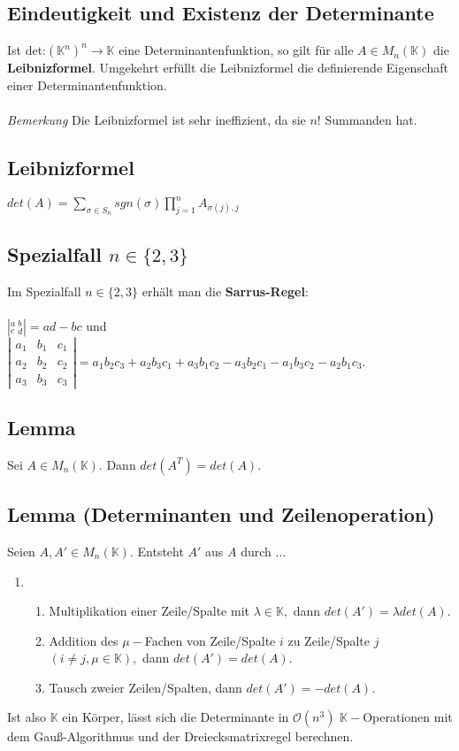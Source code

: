 \documentclass[titlepage]{article}
\newcommand{\K}{\mathbb{K}}
\newcommand{\1}{\mathbb{1}}
\newcommand{\0}{\mathbb{0}}
\begin{document}
			\subsection{Eindeutigkeit und Existenz der Determinante}
				Ist det:$(\K^n)^n\rightarrow\K$ eine Determinantenfunktion, so gilt für alle $A\in M_n(\K)$ die \textbf{Leibnizformel}. Umgekehrt erfüllt die Leibnizformel die definierende Eigenschaft einer Determinantenfunktion.\\\\
				\textit{Bemerkung} Die Leibnizformel ist sehr ineffizient, da sie $n!$ Summanden hat.
			\subsection{Leibnizformel}
				$det(A)=\sum\limits_{\sigma\in S_n} sgn(\sigma)\prod\limits_{j=1}^nA_{\sigma(j),j}$
			\subsection{Spezialfall $n\in\{2,3\}$}
			Im Spezialfall $n\in\{2,3\}$ erhält man die \textbf{Sarrus-Regel}:\\\\
			$| ^a_c\,^b_d|=ad-bc$ und $\left|\begin{smallmatrix}a_1&b_1&c_1\\a_2&b_2&c_2\\a_3&b_3&c_3\end{smallmatrix}\right|=a_1b_2c_3+a_2b_3c_1+a_3b_1c_2-a_3b_2c_1-a_1b_3c_2-a_2b_1c_3.$
			\subsection{Lemma}
				Sei $A\in M_n(\K)$. Dann $det(A^T)=det(A)$.
			\subsection{Lemma (Determinanten und Zeilenoperation)}
			Seien $A,A'\in M_n(\K).$ Entsteht $A'$ aus $A$ durch $\dots$
			\begin{enumerate}
				\item []
				\begin{enumerate}
					\item Multiplikation einer Zeile/Spalte mit $\lambda\in\K,$ dann $det(A')=\lambda det(A).$
					\item Addition des $\mu-$Fachen von Zeile/Spalte $i$ zu Zeile/Spalte $j$ $(i\neq j,\mu\in\K),$ dann $det(A')=det(A).$
					\item Tausch zweier Zeilen/Spalten, dann $det(A')=-det(A).$
				\end{enumerate}
			\end{enumerate}
			Ist also $\K$ ein Körper, lässt sich die Determinante in $\mathcal{O}(n^3)$ $\K-$Operationen mit dem Gauß-Algorithmus und der Dreiecksmatrixregel berechnen.
\end{document}
